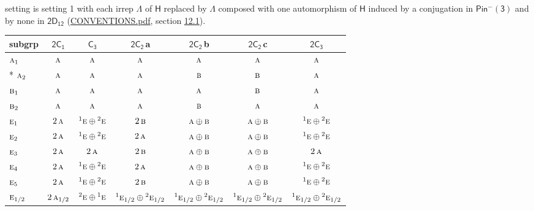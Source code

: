 \documentclass[10pt,a4paper]{article}
\numberwithin{equation}{section}
\newcommand{\grp}[1]{\mathsf{#1}}
\newcommand{\irr}[1]{\text{\normalfont\scshape #1}}
\newcommand{\conjpair}[1]{{}^{#1}}
\newcommand{\clsletter}[1]{\,{\scriptsize\color{black!55}#1}}
\begin{document}
setting is setting 1 with each irrep $\Lambda$ of $\grp{H}$ replaced by $\Lambda$ composed with one automorphism of $\grp{H}$ induced by a conjugation in \href{Pinminus3.pdf}{$\grp{Pin^{-}(3)}$} and by none in $\grp{2D_{12}}$ (\href{../../CONVENTIONS.pdf}{CONVENTIONS.pdf}, section \href{../../../rotation/CONVENTIONS.pdf\#conv.12.1}{12.1}).
{\small\begin{longtable}{@{}lcccccc@{}}\toprule
subgrp & \href{2C1.pdf}{$\grp{2C_{1}}$} & \href{C3.pdf}{$\grp{C_{3}}$} & \href{2C2.pdf}{$\grp{2C_{2}}$}\clsletter{a} & \href{2C2.pdf}{$\grp{2C_{2}}$}\clsletter{b} & \href{2C2.pdf}{$\grp{2C_{2}}$}\clsletter{c} & \href{2C3.pdf}{$\grp{2C_{3}}$}\\\midrule\endhead
\bottomrule\endfoot\endlastfoot
$\irr{a}_{1}$ & $\irr{a}$ & $\irr{a}$ & $\irr{a}$ & $\irr{a}$ & $\irr{a}$ & $\irr{a}$\\*
$\irr{a}_{2}$ & $\irr{a}$ & $\irr{a}$ & $\irr{a}$ & $\irr{b}$ & $\irr{b}$ & $\irr{a}$\\
$\irr{b}_{1}$ & $\irr{a}$ & $\irr{a}$ & $\irr{a}$ & $\irr{a}$ & $\irr{b}$ & $\irr{a}$\\
$\irr{b}_{2}$ & $\irr{a}$ & $\irr{a}$ & $\irr{a}$ & $\irr{b}$ & $\irr{a}$ & $\irr{a}$\\
$\irr{e}_{1}$ & $2\,\irr{a}$ & $\conjpair{1}\irr{e}\oplus \conjpair{2}\irr{e}$ & $2\,\irr{b}$ & $\irr{a}\oplus \irr{b}$ & $\irr{a}\oplus \irr{b}$ & $\conjpair{1}\irr{e}\oplus \conjpair{2}\irr{e}$\\
$\irr{e}_{2}$ & $2\,\irr{a}$ & $\conjpair{1}\irr{e}\oplus \conjpair{2}\irr{e}$ & $2\,\irr{a}$ & $\irr{a}\oplus \irr{b}$ & $\irr{a}\oplus \irr{b}$ & $\conjpair{1}\irr{e}\oplus \conjpair{2}\irr{e}$\\
$\irr{e}_{3}$ & $2\,\irr{a}$ & $2\,\irr{a}$ & $2\,\irr{b}$ & $\irr{a}\oplus \irr{b}$ & $\irr{a}\oplus \irr{b}$ & $2\,\irr{a}$\\
$\irr{e}_{4}$ & $2\,\irr{a}$ & $\conjpair{1}\irr{e}\oplus \conjpair{2}\irr{e}$ & $2\,\irr{a}$ & $\irr{a}\oplus \irr{b}$ & $\irr{a}\oplus \irr{b}$ & $\conjpair{1}\irr{e}\oplus \conjpair{2}\irr{e}$\\
$\irr{e}_{5}$ & $2\,\irr{a}$ & $\conjpair{1}\irr{e}\oplus \conjpair{2}\irr{e}$ & $2\,\irr{b}$ & $\irr{a}\oplus \irr{b}$ & $\irr{a}\oplus \irr{b}$ & $\conjpair{1}\irr{e}\oplus \conjpair{2}\irr{e}$\\
$\irr{e}_{1/2}$ & $2\,\irr{a}_{1/2}$ & $\conjpair{2}\irr{e}\oplus \conjpair{1}\irr{e}$ & $\conjpair{1}\irr{e}_{1/2}\oplus \conjpair{2}\irr{e}_{1/2}$ & $\conjpair{1}\irr{e}_{1/2}\oplus \conjpair{2}\irr{e}_{1/2}$ & $\conjpair{1}\irr{e}_{1/2}\oplus \conjpair{2}\irr{e}_{1/2}$ & $\conjpair{1}\irr{e}_{1/2}\oplus \conjpair{2}\irr{e}_{1/2}$\\

\end{longtable}}
\end{document}
